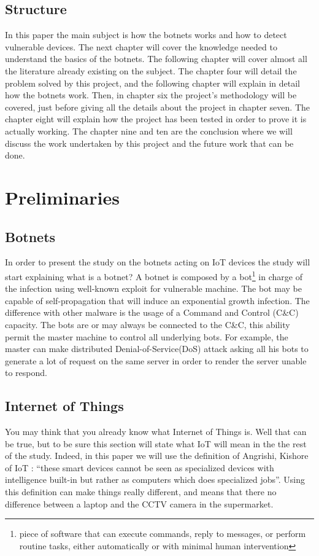 \documentclass{report}
\begin{document}
\section{Structure}
In this paper the main subject is how the botnets works and how to detect vulnerable devices.\newline
The next chapter will cover the knowledge needed to understand the basics of the botnets. The following chapter will cover almost all the literature already existing on the subject.\newline
The chapter four will detail the problem solved by this project, and the following chapter will explain in detail how the botnets work.\newline
Then, in chapter six the project's methodology will be covered, just before giving all the details about the project in chapter seven. The chapter eight will explain how the project has been tested in order to prove it is actually working.\newline
The chapter nine and ten are the conclusion where we will discuss the work undertaken by this project and the future work that can be done.

\chapter{Preliminaries}
\section{Botnets}
In order to present the study on the botnets acting on IoT devices the study will start explaining what is a botnet? A botnet is composed by a bot\footnote{piece of software that can execute commands, reply to messages, or perform routine tasks, either automatically or with minimal human intervention} in charge of the infection using well-known exploit for vulnerable machine. The bot may be capable of self-propagation that will induce an exponential growth infection. The difference with other malware is the usage of a Command and Control (C\&C) capacity. The bots are or may always be connected to the C\&C, this ability permit the master machine to control all underlying bots. For example, the master can make distributed Denial-of-Service(DoS) attack asking all his bots to generate a lot of request on the same server in order to render the server unable to respond.

\section{Internet of Things}
\label{sec:preiot}
You may think that you already know what Internet of Things is. Well that can be true, but to be sure this section will state what IoT will mean in the the rest of the study. Indeed, in this paper we will use the definition of Angrishi, Kishore \autocite{angrishi2017turning} of IoT : ``these smart devices cannot be seen as specialized devices with intelligence built-in but rather as computers which does specialized jobs''. Using this definition can make things really different, and means that there no difference between a laptop and the CCTV camera in the supermarket.
\end{document}
